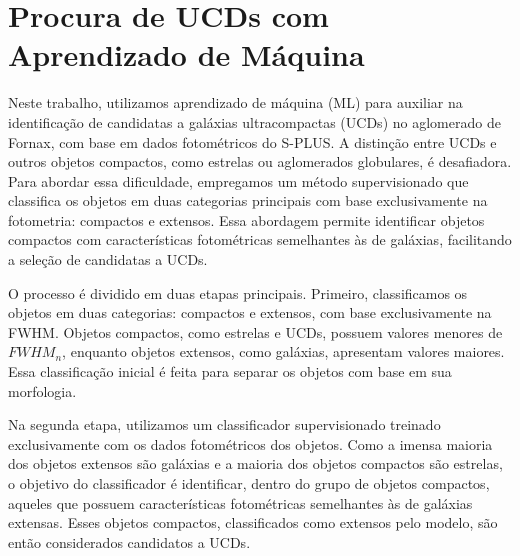 
\section{Procura de UCDs com Aprendizado de Máquina}\label{sec:aprendizado_maquina}
Neste trabalho, utilizamos aprendizado de máquina (\ac{ML}) para auxiliar na identificação de candidatas a galáxias ultracompactas (UCDs) no aglomerado de Fornax, com base em dados fotométricos do S-PLUS. A distinção entre UCDs e outros objetos compactos, como estrelas ou aglomerados globulares, é desafiadora. Para abordar essa dificuldade, empregamos um método supervisionado que classifica os objetos em duas categorias principais com base exclusivamente na fotometria: compactos e extensos. Essa abordagem permite identificar objetos compactos com características fotométricas semelhantes às de galáxias, facilitando a seleção de candidatas a UCDs.

O processo é dividido em duas etapas principais. Primeiro, classificamos os objetos em duas categorias: compactos e extensos, com base exclusivamente na \ac{FWHM}. Objetos compactos, como estrelas e UCDs, possuem valores menores de $\textit{FWHM}_n$, enquanto objetos extensos, como galáxias, apresentam valores maiores. Essa classificação inicial é feita para separar os objetos com base em sua morfologia.

Na segunda etapa, utilizamos um classificador supervisionado treinado exclusivamente com os dados fotométricos dos objetos. Como a imensa maioria dos objetos extensos são galáxias e a maioria dos objetos compactos são estrelas, o objetivo do classificador é identificar, dentro do grupo de objetos compactos, aqueles que possuem características fotométricas semelhantes às de galáxias extensas. Esses objetos compactos, classificados como extensos pelo modelo, são então considerados candidatos a UCDs.

